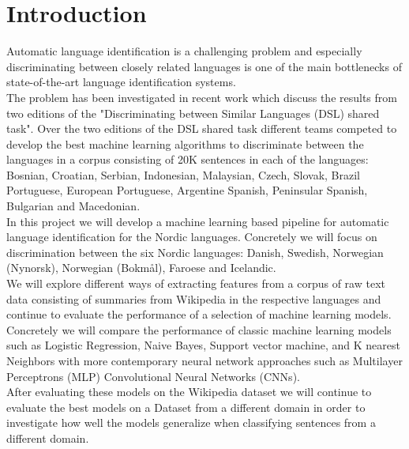 \section{Introduction}
Automatic language identification is a challenging problem and especially discriminating between closely related languages is one of the main bottlenecks of state-of-the-art language identification systems.\cite{DSL2014}\\

The problem has been investigated in recent work \cite{DSLEvaluation}\cite{DSL2015} which discuss the results from two editions of the "Discriminating between Similar Languages (DSL) shared task". Over the two editions of the DSL shared task different teams competed to develop the best machine learning algorithms to discriminate between the languages in a corpus consisting of 20K sentences in each of the languages: Bosnian, Croatian, Serbian, Indonesian, Malaysian, Czech, Slovak, Brazil Portuguese, European Portuguese, Argentine Spanish, Peninsular Spanish, Bulgarian and Macedonian.\\

In this project we will develop a machine learning based pipeline for automatic language identification for the Nordic languages. Concretely we will focus on discrimination between the six Nordic languages: Danish, Swedish, Norwegian (Nynorsk), Norwegian (Bokmål), Faroese and  Icelandic.\\

We will explore different ways of extracting features from a corpus of raw text data consisting of summaries from Wikipedia in the respective languages and continue to evaluate the performance of a selection of machine learning models.\\

Concretely we will compare the performance of classic machine learning models such as Logistic Regression, Naive Bayes, Support vector machine, and K nearest Neighbors with more contemporary neural network approaches such as Multilayer Perceptrons (MLP)  Convolutional Neural Networks (CNNs).\\

After evaluating these models on the Wikipedia dataset we will continue to evaluate the best models on a Dataset from a different domain in order to investigate how well the models generalize when classifying sentences from a different domain.


